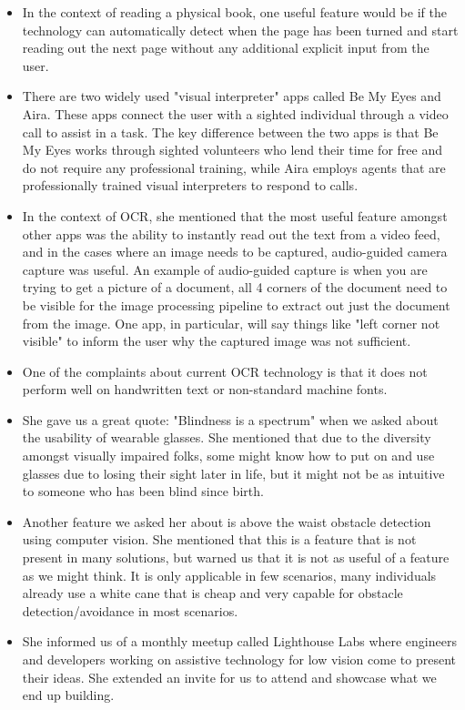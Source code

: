 \documentclass[a4paper,11pt]{article}
\begin{document}
\begin{itemize}
    \item In the context of reading a physical book, one useful feature would be if the technology can automatically detect when the page has been turned and start reading out the next page without any additional explicit input from the user.
    \item There are two widely used "visual interpreter" apps called Be My Eyes and Aira. These apps connect the user with a sighted individual through a video call to assist in a task. The key difference between the two apps is that Be My Eyes works through sighted volunteers who lend their time for free and do not require any professional training, while Aira employs agents that are professionally trained visual interpreters to respond to calls.
    \item In the context of OCR, she mentioned that the most useful feature amongst other apps was the ability to instantly read out the text from a video feed, and in the cases where an image needs to be captured, audio-guided camera capture was useful. An example of audio-guided capture is when you are trying to get a picture of a document, all 4 corners of the document need to be visible for the image processing pipeline to extract out just the document from the image. One app, in particular, will say things like "left corner not visible" to inform the user why the captured image was not sufficient.
    \item One of the complaints about current OCR technology is that it does not perform well on handwritten text or non-standard machine fonts.
    \item She gave us a great quote: "Blindness is a spectrum" when we asked about the usability of wearable glasses. She mentioned that due to the diversity amongst visually impaired folks, some might know how to put on and use glasses due to losing their sight later in life, but it might not be as intuitive to someone who has been blind since birth.
    \item Another feature we asked her about is above the waist obstacle detection using computer vision. She mentioned that this is a feature that is not present in many solutions, but warned us that it is not as useful of a feature as we might think. It is only applicable in few scenarios, many individuals already use a white cane that is cheap and very capable for obstacle detection/avoidance in most scenarios.
    \item She informed us of a monthly meetup called Lighthouse Labs where engineers and developers working on assistive technology for low vision come to present their ideas. She extended an invite for us to attend and showcase what we end up building.
\end{itemize}
\end{document}
